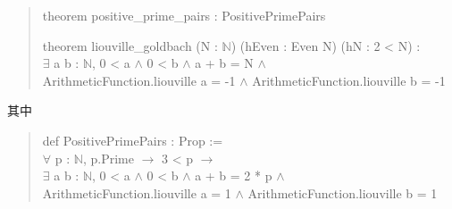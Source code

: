\documentclass[11pt,a4paper]{ctexart}
\theoremstyle{plain}
\theoremstyle{definition}
\begin{document}
\begin{quote}\ttfamily\small
theorem positive\_prime\_pairs : PositivePrimePairs

theorem liouville\_goldbach (N : $\mathbb{N}$) (hEven : Even N) (hN : 2 < N) :\\
\quad $\exists$ a b : $\mathbb{N}$, 0 < a $\wedge$ 0 < b $\wedge$ a + b = N $\wedge$\\
\quad\quad ArithmeticFunction.liouville a = -1 $\wedge$ ArithmeticFunction.liouville b = -1
\end{quote}

其中
\begin{quote}\ttfamily\small
def PositivePrimePairs : Prop :=\\
\quad $\forall$ p : $\mathbb{N}$, p.Prime $\to$ 3 < p $\to$\\
\quad\quad $\exists$ a b : $\mathbb{N}$, 0 < a $\wedge$ 0 < b $\wedge$ a + b = 2 * p $\wedge$\\
\quad\quad\quad ArithmeticFunction.liouville a = 1 $\wedge$ ArithmeticFunction.liouville b = 1
\end{quote}
\end{document}
